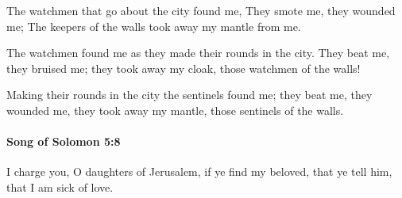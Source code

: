 			\begin{versebox}
					\item[BHS] 
					\item[LXX] 
					\item[ASV] The watchmen that go about the city found me, They smote me, they wounded me; The keepers of the walls took away my mantle from me.
					\item[NIV] The watchmen found me as they made their rounds in the city. They beat me, they bruised me; they took away my cloak, those watchmen of the walls!
					\item[NRSV] Making their rounds in the city the sentinels found me; they beat me, they wounded me, they took away my mantle, those sentinels of the walls.
			\end{versebox}

		\paragraph{Song of Solomon 5:8} %
			\label{SONGOFSOLOMON-5-8}

			I charge you, O daughters of Jerusalem, if ye find my beloved, that ye tell him, that I am sick of love.

